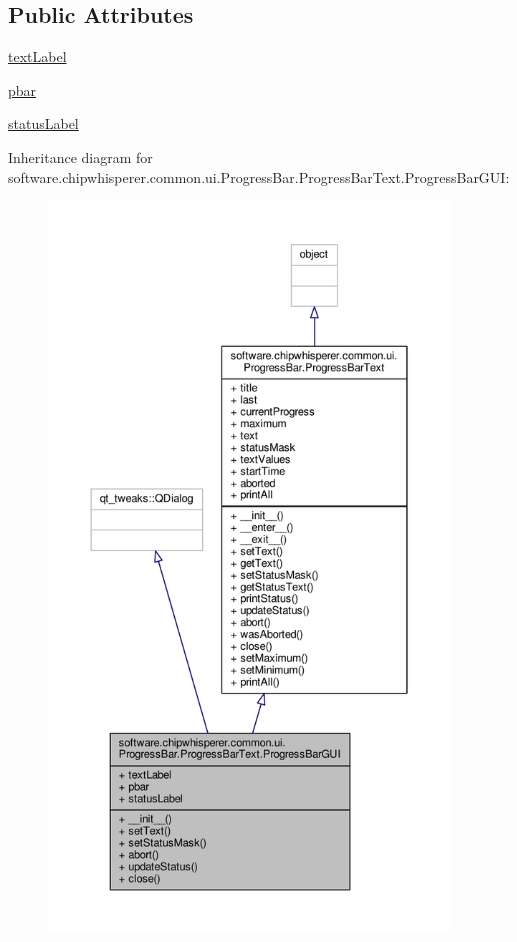 \subsection*{Public Attributes}
\begin{DoxyCompactItemize}
\item 
\hyperlink{classsoftware_1_1chipwhisperer_1_1common_1_1ui_1_1ProgressBar_1_1ProgressBarText_1_1ProgressBarGUI_a6fd33b46e1480e19484fba4f5116fc73}{text\+Label}
\item 
\hyperlink{classsoftware_1_1chipwhisperer_1_1common_1_1ui_1_1ProgressBar_1_1ProgressBarText_1_1ProgressBarGUI_a73f24573ffbdff505ea91a737aa43b72}{pbar}
\item 
\hyperlink{classsoftware_1_1chipwhisperer_1_1common_1_1ui_1_1ProgressBar_1_1ProgressBarText_1_1ProgressBarGUI_a8b531d7c36146d8c95034d843865c744}{status\+Label}
\end{DoxyCompactItemize}


Inheritance diagram for software.\+chipwhisperer.\+common.\+ui.\+Progress\+Bar.\+Progress\+Bar\+Text.\+Progress\+Bar\+G\+U\+I\+:\nopagebreak
\begin{figure}[H]
\begin{center}
\leavevmode
\includegraphics[height=550pt]{d7/dc1/classsoftware_1_1chipwhisperer_1_1common_1_1ui_1_1ProgressBar_1_1ProgressBarText_1_1ProgressBarGUI__inherit__graph}
\end{center}
\end{figure}


